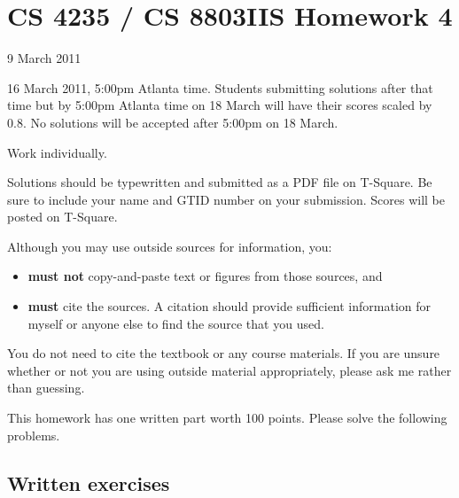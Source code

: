 \documentclass[letterpaper]{article}
\title{}
\date{}
\begin{document}
\thispagestyle{empty}

\section*{CS 4235 / CS 8803IIS Homework 4}

 9 March 2011

 16 March 2011, 5:00pm Atlanta time. Students submitting solutions after that time but by 5:00pm Atlanta time on 18 March will have their scores scaled by 0.8. No solutions will be accepted after 5:00pm on 18 March.

 Work individually.

\bigskip\noindent
Solutions should be typewritten and submitted as a PDF file on T-Square. Be sure to include your name and GTID number on your submission. Scores will be posted on T-Square.

\bigskip\noindent
Although you may use outside sources for information, you:
\begin{itemize}
\item {\bf must not} copy-and-paste text or figures from those sources, and
\item {\bf must} cite the sources. A citation should provide sufficient information for myself or anyone else to find the source that you used.
\end{itemize}
You do not need to cite the textbook or any course materials. If you are unsure whether or not you are using outside material appropriately, please ask me rather than guessing.

This homework has one written part worth 100 points. Please solve the following problems.

\subsection*{Written exercises}
\end{document}
